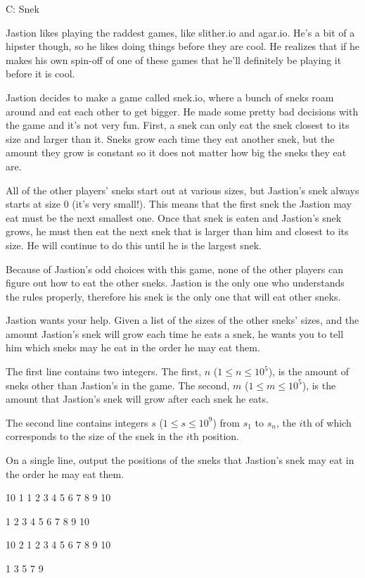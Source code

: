 \begin{problem}{C: Snek}

Jastion likes playing the raddest games, like slither.io and agar.io.
He's a bit of a hipster though, so he likes doing things before they are cool.
He realizes that if he makes his own spin-off of one of these games that he'll definitely be playing it before it is cool.

Jastion decides to make a game called snek.io, where a bunch of sneks roam around and eat each other to get bigger.
He made some pretty bad decisions with the game and it's not very fun.
First, a snek can only eat the snek closest to its size and larger than it.
Sneks grow each time they eat another snek, but the amount they grow is constant so it does not matter how big the sneks they eat are.

All of the other players' sneks start out at various sizes, but Jastion's snek always starts at size $0$ (it's very small!).
This means that the first snek the Jastion may eat must be the next smallest one.
Once that snek is eaten and Jastion's snek grows, he must then eat the next snek that is larger than him and closest to its size.
He will continue to do this until he is the largest snek.

Because of Jastion's odd choices with this game, none of the other players can figure out how to eat the other sneks.
Jastion is the only one who understands the rules properly, therefore his snek is the only one that will eat other sneks.

Jastion wants your help.
Given a list of the sizes of the other sneks' sizes, and the amount Jastion's snek will grow each time he eats a snek, he wants you to tell him which sneks may he eat in the order he may eat them.
\end{problem}

\begin{formalin}
The first line contains two integers. The first, $n$ ($1 \leq n \leq 10^5$), is the amount of sneks other than Jastion's in the game.
The second, $m$ ($1 \leq m \leq 10^5$), is the amount that Jastion's snek will grow after each snek he eats.

The second line contains integers $s$ ($1 \leq s \leq 10^9$) from $s_1$ to $s_n$, the $i$th of which corresponds to the size of the snek in the $i$th position.
\end{formalin}

\begin{formalout}
On a single line, output the positions of the sneks that Jastion's snek may eat in the order he may eat them.
\end{formalout}

\begin{datain}
10 1
1 2 3 4 5 6 7 8 9 10
\end{datain}
\begin{dataout}
1 2 3 4 5 6 7 8 9 10
\end{dataout}

\begin{datain}
10 2
1 2 3 4 5 6 7 8 9 10
\end{datain}
\begin{dataout}
1 3 5 7 9
\end{dataout}